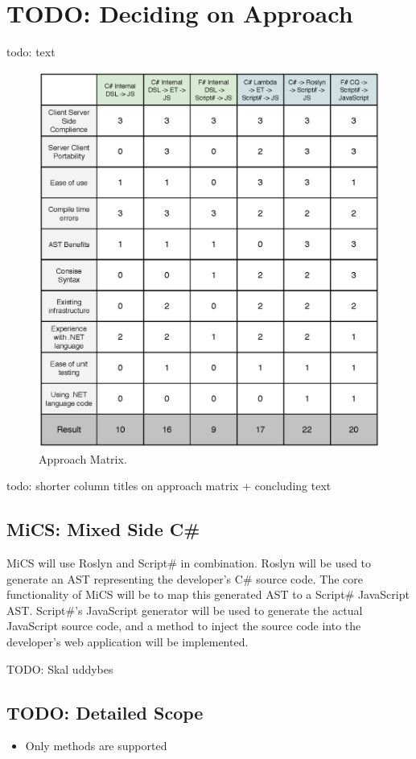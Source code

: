 
\section{TODO: Deciding on Approach} %
\label{sec:deciding_on_approach}
	todo: text

		\begin{figure}[H]
			\begin{center}
				\centerline{\includegraphics[width=16cm]{resources/images/approachmatrix.eps}}
			\end{center}
			\caption{Approach Matrix.}
			\label{approachMatrix}
		\end{figure}


	todo: shorter column titles on approach matrix + concluding text


	\subsection{MiCS: Mixed Side C\#} %
	\label{sub:mics_mixed_side_csharp}
	MiCS will use Roslyn and Script\# in combination. Roslyn will be used to generate an AST representing the developer's C\# source code. The core functionality of MiCS will be to map this generated AST to a Script\# JavaScript AST. Script\#'s JavaScript generator will be used to generate the actual JavaScript source code, and a method to inject the source code into the developer's web application will be implemented.

	TODO: Skal uddybes

	\subsection{TODO: Detailed Scope} %
	\label{sub:detailed_scope}
	
		\begin{itemize}
			\item Only methods are supported
		\end{itemize}

